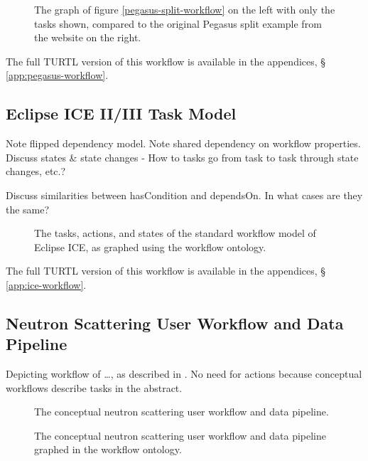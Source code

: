 \begin{figure}[htbp]
\centering
{}
\caption{The graph of figure \ref{pegasus-split-workflow} on the left with only
the tasks shown, compared to the original Pegasus split example from the
website on the right.}
\label{pegasus-comparison}
\end{figure}

The full TURTL version of this workflow is available in the appendices, \S
\ref{app:pegasus-workflow}.

\subsection{Eclipse ICE II/III Task Model}

Note flipped dependency model. Note shared dependency on workflow properties.
Discuss states \& state changes - How to tasks go from task to task through
state changes, etc.?

Discuss similarities between hasCondition and dependsOn. In what cases are they
the same?

\begin{figure}[htbp]
\centering
{}
\caption{The tasks, actions, and states of the standard workflow model of
Eclipse ICE, as graphed using the workflow ontology.}
\label{ice-workflow}
\end{figure}

The full TURTL version of this workflow is available in the appendices, \S
\ref{app:ice-workflow}.

\subsection{Neutron Scattering User Workflow and Data Pipeline}

Depicting workflow of \ldots, as described in \cite{sns-hfir-data-review}. No
need for actions because conceptual workflows describe tasks in the abstract.

\begin{figure}[htbp]
\centering
{}
\caption{The conceptual neutron scattering user workflow and data pipeline.}
\label{neutron-workflow}
\end{figure}

\begin{figure}[htbp]
\centering
{}
\caption{The conceptual neutron scattering user workflow and data pipeline
graphed in the workflow ontology.}
\label{neutron-workflow-graph}
\end{figure}

